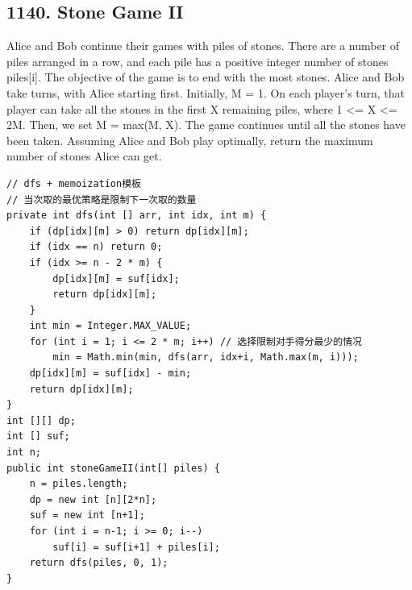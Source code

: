 \documentclass[9pt, b5paper]{article}
\begin{document}
\subsection{1140. Stone Game II}
\label{sec-4-23}
Alice and Bob continue their games with piles of stones.  There are a number of piles arranged in a row, and each pile has a positive integer number of stones piles[i].  The objective of the game is to end with the most stones. 
Alice and Bob take turns, with Alice starting first.  Initially, M = 1.
On each player's turn, that player can take all the stones in the first X remaining piles, where 1 <= X <= 2M.  Then, we set M = max(M, X).
The game continues until all the stones have been taken.
Assuming Alice and Bob play optimally, return the maximum number of stones Alice can get.
\begin{verbatim}
// dfs + memoization模板
// 当次取的最优策略是限制下一次取的数量
private int dfs(int [] arr, int idx, int m) {
    if (dp[idx][m] > 0) return dp[idx][m];
    if (idx == n) return 0;
    if (idx >= n - 2 * m) {
        dp[idx][m] = suf[idx];
        return dp[idx][m];
    }
    int min = Integer.MAX_VALUE;
    for (int i = 1; i <= 2 * m; i++) // 选择限制对手得分最少的情况
        min = Math.min(min, dfs(arr, idx+i, Math.max(m, i))); 
    dp[idx][m] = suf[idx] - min;
    return dp[idx][m];
}
int [][] dp; 
int [] suf;
int n;
public int stoneGameII(int[] piles) {
    n = piles.length;
    dp = new int [n][2*n];
    suf = new int [n+1];
    for (int i = n-1; i >= 0; i--) 
        suf[i] = suf[i+1] + piles[i];
    return dfs(piles, 0, 1);
}
\end{verbatim}
\end{document}
